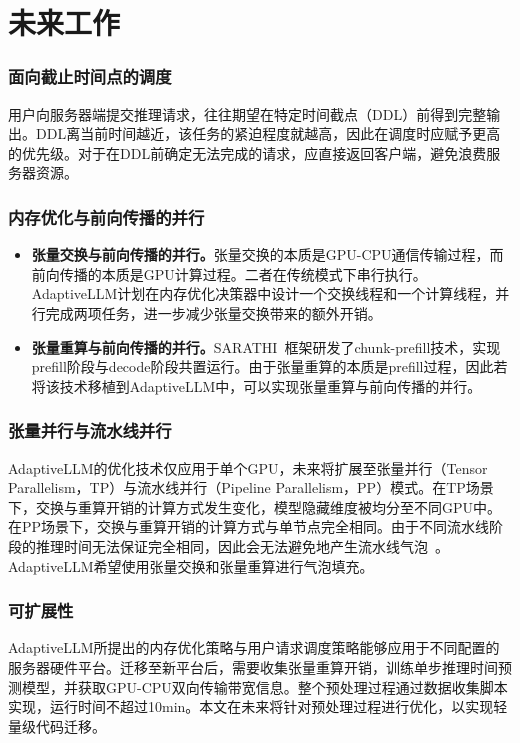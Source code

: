 \section{未来工作}

\subsubsection{面向截止时间点的调度}

{\color{red}用户向服务器端提交推理请求，往往期望在特定时间截点（DDL）前得到完整输出。DDL离当前时间越近，该任务的紧迫程度就越高，因此在调度时应赋予更高的优先级。对于在DDL前确定无法完成的请求，应直接返回客户端，避免浪费服务器资源。}

\subsubsection{内存优化与前向传播的并行}

\begin{itemize}

    \item \textbf{张量交换与前向传播的并行。}张量交换的本质是GPU-CPU通信传输过程，而前向传播的本质是GPU计算过程。二者在传统模式下串行执行。AdaptiveLLM计划在内存优化决策器中设计一个交换线程和一个计算线程，并行完成两项任务，进一步减少张量交换带来的额外开销。

    \item \textbf{张量重算与前向传播的并行。}SARATHI~\cite{SARATHI}框架研发了chunk-prefill技术，实现prefill阶段与decode阶段共置运行。由于张量重算的本质是prefill过程，因此若将该技术移植到AdaptiveLLM中，可以实现张量重算与前向传播的并行。

\end{itemize}

\subsubsection{张量并行与流水线并行~\cite{Parallelism}} 

{\color{red}AdaptiveLLM的优化技术仅应用于单个GPU，未来将扩展至张量并行（Tensor Parallelism，TP）与流水线并行（Pipeline Parallelism，PP）模式。在TP场景下，交换与重算开销的计算方式发生变化，模型隐藏维度被均分至不同GPU中。在PP场景下，交换与重算开销的计算方式与单节点完全相同。由于不同流水线阶段的推理时间无法保证完全相同，因此会无法避免地产生流水线气泡~\cite{AdaPipe, GPipe, DAPPLE, PipeDream}。AdaptiveLLM希望使用张量交换和张量重算进行气泡填充。}

\subsubsection{可扩展性}

{\color{red}AdaptiveLLM所提出的内存优化策略与用户请求调度策略能够应用于不同配置的服务器硬件平台。迁移至新平台后，需要收集张量重算开销，训练单步推理时间预测模型，并获取GPU-CPU双向传输带宽信息。整个预处理过程通过数据收集脚本实现，运行时间不超过10min。本文在未来将针对预处理过程进行优化，以实现轻量级代码迁移。}

